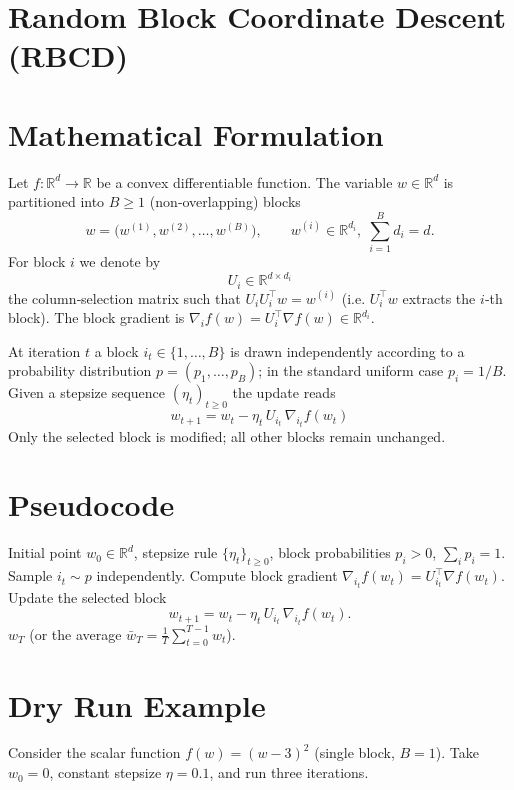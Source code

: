 \documentclass{article}
\newcommand{\RR}{\mathbb{R}}
\newcommand{\grad}[1]{\nabla_{#1}}
\begin{document}
\section*{Random Block Coordinate Descent (RBCD)}

\section*{Mathematical Formulation}
Let $f:\RR^{d}\to\RR$ be a convex differentiable function.  
The variable $w\in\RR^{d}$ is partitioned into $B\ge 1$ (non‑overlapping) blocks
\[
w=\bigl(w^{(1)},w^{(2)},\dots ,w^{(B)}\bigr),\qquad 
w^{(i)}\in\RR^{d_i},\; \sum_{i=1}^{B}d_i=d .
\]
For block $i$ we denote by 
\[
U_i\in\RR^{d\times d_i}
\]
the column‑selection matrix such that $U_iU_i^{\top}w = w^{(i)}$ (i.e. $U_i^{\top}w$ extracts the $i$‑th block).  
The block gradient is $\grad{i}f(w)=U_i^{\top}\nabla f(w)\in\RR^{d_i}$.

At iteration $t$ a block $i_t\in\{1,\dots ,B\}$ is drawn independently
according to a probability distribution $p=(p_1,\dots ,p_B)$; in the
standard uniform case $p_i=1/B$.
Given a stepsize sequence $(\eta_t)_{t\ge0}$ the update reads
\begin{equation}
\boxed{
w_{t+1}=w_t-\eta_t\,U_{i_t}\,\grad{i_t}f(w_t)
}\tag{1}
\end{equation}
Only the selected block is modified; all other blocks remain unchanged.

\section*{Pseudocode}
\begin{algorithm}[H]
\caption{Random Block Coordinate Descent}
\begin{algorithmic}[1]
\REQUIRE Initial point $w_0\in\RR^{d}$, stepsize rule $\{\eta_t\}_{t\ge0}$,
          block probabilities $p_i>0$, $ \sum_i p_i=1$.
    \STATE Sample $i_t\sim p$ independently.
    \STATE Compute block gradient $\grad{i_t}f(w_t)=U_{i_t}^{\top}\nabla f(w_t)$.
    \STATE Update the selected block
          \[
          w_{t+1}=w_t-\eta_t\,U_{i_t}\,\grad{i_t}f(w_t).
          \]
\ENDFOR
\RETURN $w_T$ (or the average $\bar w_T=\frac1T\sum_{t=0}^{T-1}w_t$).
\end{algorithmic}
\end{algorithm}

\section*{Dry Run Example}
Consider the scalar function $f(w)=(w-3)^2$ (single block, $B=1$).  
Take $w_0=0$, constant stepsize $\eta=0.1$, and run three iterations.
\end{document}
